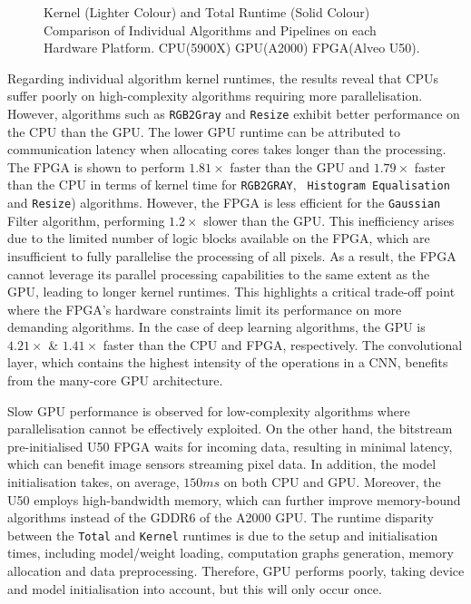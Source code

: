 \documentclass[]{spie}  %
\begin{document}
\begin{figure}
    \centering
\resizebox{0.7\linewidth}{!}{}    %
    \caption[SIFT Power Consumption]{Kernel (Lighter Colour) and Total Runtime (Solid Colour) Comparison of Individual Algorithms and Pipelines on each Hardware Platform. CPU(5900X) GPU(A2000) FPGA(Alveo U50).}
    \label{fig:IndividualRuntime}
\end{figure}

Regarding individual algorithm kernel runtimes, the results reveal that CPUs suffer poorly on high-complexity algorithms requiring more parallelisation. However, algorithms such as \texttt{RGB2Gray} and \texttt{Resize} exhibit better performance on the CPU than the GPU. The lower GPU runtime can be attributed to communication latency when allocating cores takes longer than the processing. The FPGA is shown to perform $1.81\times$ faster than the GPU and $1.79\times$ faster than the CPU in terms of kernel time for \texttt{RGB2GRAY}, \texttt{ Histogram Equalisation} and \texttt{Resize}) algorithms. However, the FPGA is less efficient for the \texttt{Gaussian} Filter algorithm, performing $1.2\times$ slower than the GPU. This inefficiency arises due to the limited number of logic blocks available on the FPGA, which are insufficient to fully parallelise the processing of all pixels. As a result, the FPGA cannot leverage its parallel processing capabilities to the same extent as the GPU, leading to longer kernel runtimes. This highlights a critical trade-off point where the FPGA's hardware constraints limit its performance on more demanding algorithms. In the case of deep learning algorithms, the GPU is $4.21\times$ \& $1.41\times$ faster than the CPU and FPGA, respectively. The convolutional layer, which contains the highest intensity of the operations in a CNN, benefits from the many-core GPU architecture. 

Slow GPU performance is observed for low-complexity algorithms where parallelisation cannot be effectively exploited. On the other hand, the bitstream pre-initialised U50 FPGA waits for incoming data, resulting in minimal latency, which can benefit image sensors streaming pixel data. In addition, the model initialisation takes, on average, $150ms$ on both CPU and GPU. Moreover, the U50 employs high-bandwidth memory, which can further improve memory-bound algorithms instead of the GDDR6 of the A2000 GPU. The runtime disparity between the \texttt{Total} and \texttt{Kernel} runtimes is due to the setup and initialisation times, including model/weight loading, computation graphs generation, memory allocation and data preprocessing. Therefore, GPU performs poorly, taking device and model initialisation into account, but this will only occur once.
\end{document}
